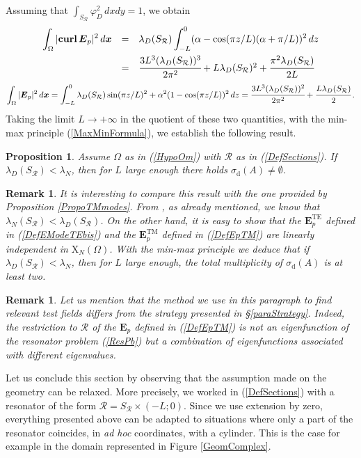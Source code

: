 \documentclass[11pt,a4paper]{article}
\newcommand{\dsp}{\displaystyle}
\newcommand{\Om}{\Omega}
\newcommand{\mrm}[1]{\mathrm{#1}}
\newcommand{\bfx}{\boldsymbol{x}}
\newcommand{\mX}{\mrm{X}}
\newcommand{\curlvec}{\boldsymbol{\mrm{curl}}\,}
\def\E{\boldsymbol{E}}
\newtheorem{remark}[theorem]{Remark}
\newtheorem{proposition}[theorem]{Proposition}
\begin{document}
Assuming that $\int_{S_{\mathcal{R}}}\varphi_D^2\,dxdy=1$, we obtain
\[
\begin{array}{rcl}
\dsp\int_{\Om} |\curlvec\E_{p}|^2\,d\bfx&=&\dsp\lambda_D(S_{\mathcal{R}})\int_{-L}^0(\alpha-\cos(\pi z/L)(\alpha+\pi/L))^2\,dz\\[10pt]
&=&\cfrac{3 L^3(\lambda_D(S_{\mathcal{R}}))^3}{2\pi^2} + L\lambda_D(S_{\mathcal{R}})^2 + \cfrac{\pi^2\lambda_D(S_{\mathcal{R}})}{2L}
\end{array}
\]
\[
\int_{\Om} |\E_{p}|^2\,d\bfx=\int_{-L}^0\lambda_D(S_{\mathcal{R}})\sin(\pi z/L)^2+\alpha^2(1-\cos(\pi z/L))^2\,dz=\cfrac{3 L^3(\lambda_D(S_{\mathcal{R}}))^2}{2\pi^2} + \cfrac{L\lambda_D(S_{\mathcal{R}})}{2}\,.
\]
Taking the limit $L\to+\infty$ in the quotient of these two quantities, with the min-max principle (\ref{MaxMinFormula}), we establish the following result.
\begin{proposition}
Assume $\Om$ as in (\ref{HypoOm}) with $\mathcal{R}$ as in (\ref{DefSections}). If $\lambda_D(S_{\mathcal{R}})<\lambda_N$, then for $L$ large enough there holds $\sigma_{\mrm{d}}(A)\ne\emptyset$. 
\end{proposition}
\begin{remark}
It is interesting to compare this result with the one provided by Proposition \ref{PropoTMmodes}. From \cite{Filo05}, as already mentioned, we know that $\lambda_N(S_{\mathcal{R}})<\lambda_D(S_{\mathcal{R}})$. On the other hand, it is easy to show that the $\E^{\mrm{TE}}_{p}$ defined in (\ref{DefEModeTEbis}) and the $\E^{\mrm{TM}}_{p}$ defined in (\ref{DefEpTM}) are linearly independent in $\boldsymbol{\mX}_N(\Om)$. With the min-max principle we deduce that if $\lambda_D(S_{\mathcal{R}})<\lambda_N$, then for $L$ large enough, the total multiplicity of $\sigma_{\mrm{d}}(A)$ is at least two. 
\end{remark}
\begin{remark}
Let us mention that the method we use in this paragraph to find relevant test fields differs from the strategy presented in \S\ref{paraStrategy}. Indeed, the restriction to $\mathcal{R}$ of the $\E_p$ defined in (\ref{DefEpTM}) is not an eigenfunction of the resonator problem (\ref{ResPb}) but a combination of eigenfunctions associated with different eigenvalues.
\end{remark}

\noindent Let us conclude this section by observing that the assumption made on the geometry can be relaxed. More precisely, we worked in (\ref{DefSections}) with a resonator of the form $\mathcal{R}=S_{\mathcal{R}}\times(-L;0)$. Since we use extension by zero, everything presented above can be adapted to situations where only a part of the resonator coincides, in \textit{ad hoc} coordinates, with a cylinder. This is the case for example in the domain represented in Figure \ref{GeomComplex}.
\end{document}
